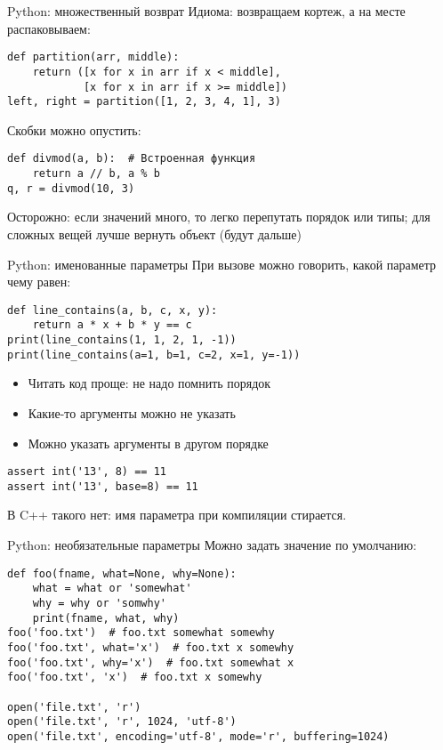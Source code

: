 \begin{frame}[t,fragile]{Python: множественный возврат}
	Идиома: возвращаем кортеж, а на месте распаковываем:
\begin{verbatim}
def partition(arr, middle):
    return ([x for x in arr if x < middle],
            [x for x in arr if x >= middle])
left, right = partition([1, 2, 3, 4, 1], 3)
\end{verbatim}

	Скобки можно опустить:
\begin{verbatim}
def divmod(a, b):  # Встроенная функция
    return a // b, a % b
q, r = divmod(10, 3)
\end{verbatim}

	Осторожно: если значений много, то легко перепутать порядок или типы;
	для сложных вещей лучше вернуть объект (будут дальше)
\end{frame}

\begin{frame}[t,fragile]{Python: именованные параметры}
	При вызове можно говорить, какой параметр чему равен:
\begin{verbatim}
def line_contains(a, b, c, x, y):
	return a * x + b * y == c
print(line_contains(1, 1, 2, 1, -1))
print(line_contains(a=1, b=1, c=2, x=1, y=-1))
\end{verbatim}
	\begin{itemize}
	\item Читать код проще: не надо помнить порядок
	\item Какие-то аргументы можно не указать
	\item Можно указать аргументы в другом порядке
	\end{itemize}

\begin{verbatim}
assert int('13', 8) == 11
assert int('13', base=8) == 11
\end{verbatim}
	В C++ такого нет: имя параметра при компиляции стирается.
\end{frame}

\begin{frame}[t,fragile]{Python: необязательные параметры}
	Можно задать значение по умолчанию:
\begin{verbatim}
def foo(fname, what=None, why=None):
    what = what or 'somewhat'
    why = why or 'somwhy'
    print(fname, what, why)
foo('foo.txt')  # foo.txt somewhat somewhy
foo('foo.txt', what='x')  # foo.txt x somewhy
foo('foo.txt', why='x')  # foo.txt somewhat x
foo('foo.txt', 'x')  # foo.txt x somewhy

open('file.txt', 'r')
open('file.txt', 'r', 1024, 'utf-8')
open('file.txt', encoding='utf-8', mode='r', buffering=1024)
\end{verbatim}
\end{frame}

